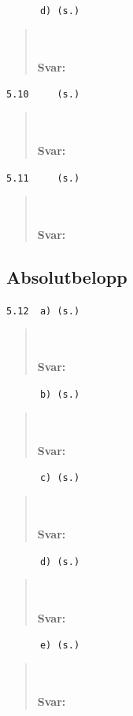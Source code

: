 \documentclass[a4paper]{article}
\newcommand{\tskcol}[1]{\textcolor{tskcol}{#1}}
\begin{document}
	\texttt{\tskcol{~~~~~~d) (s.)}}
	\begin{quotation}
		\noindent
		\\ \\
		\textbf{Svar:}
	\end{quotation}
	
	\texttt{\tskcol{5.10~~~~ (s.)}}
	\begin{quotation}
		\noindent
		\\ \\
		\textbf{Svar:}
	\end{quotation}
	
	\texttt{\tskcol{5.11~~~~ (s.)}}
	\begin{quotation}
		\noindent
		\\ \\
		\textbf{Svar:}
	\end{quotation}
	
	\subsection*{Absolutbelopp}
	
	\texttt{\tskcol{5.12~~a) (s.)}}
	\begin{quotation}
		\noindent
		\\ \\
		\textbf{Svar:}
	\end{quotation}
	
	\texttt{\tskcol{~~~~~~b) (s.)}}
	\begin{quotation}
		\noindent
		\\ \\
		\textbf{Svar:}
	\end{quotation}
	
	\texttt{\tskcol{~~~~~~c) (s.)}}
	\begin{quotation}
		\noindent
		\\ \\
		\textbf{Svar:}
	\end{quotation}
	
	\texttt{\tskcol{~~~~~~d) (s.)}}
	\begin{quotation}
		\noindent
		\\ \\
		\textbf{Svar:}
	\end{quotation}
	
	\texttt{\tskcol{~~~~~~e) (s.)}}
	\begin{quotation}
		\noindent
		\\ \\
		\textbf{Svar:}
	\end{quotation}
	
\end{document}
